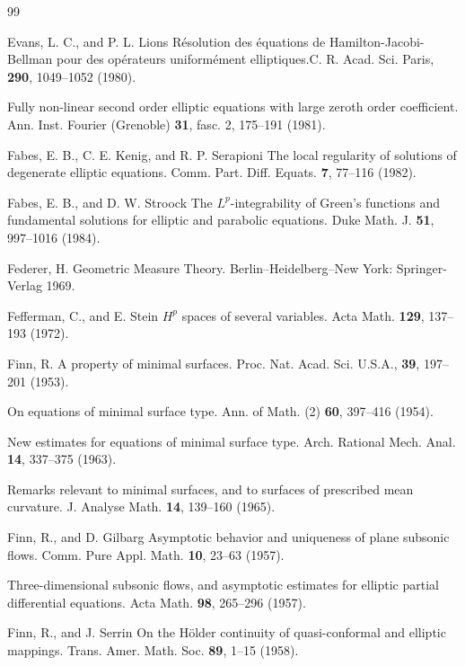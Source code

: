 \begin{thebibliography}{99}

Evans, L. C., and P. L. Lions
Résolution des équations de Hamilton-Jacobi-Bellman pour des opérateurs uniformément
elliptiques.C. R. Acad. Sci. Paris, \textbf{290}, 1049--1052 (1980).

Fully non-linear second order elliptic equations with large zeroth order coefficient. Ann.
Inst. Fourier (Grenoble) \textbf{31}, fasc. 2, 175--191 (1981).

Fabes, E. B., C. E. Kenig, and R. P. Serapioni
The local regularity of solutions of degenerate elliptic equations. Comm. Part. Diff. Equats.
\textbf{7}, 77--116 (1982).

Fabes, E. B., and D. W. Stroock
The $L^p$-integrability of Green's functions and fundamental solutions for elliptic and
parabolic equations. Duke Math. J. \textbf{51}, 997--1016 (1984).

Federer, H.
Geometric Measure Theory. Berlin--Heidelberg--New York: Springer-Verlag 1969.

Fefferman, C., and E. Stein
$H^p$ spaces of several variables. Acta Math. \textbf{129}, 137--193 (1972).

Finn, R.
A property of minimal surfaces. Proc. Nat. Acad. Sci. U.S.A., \textbf{39}, 197--201 (1953).

On equations of minimal surface type. Ann. of Math. (2) \textbf{60}, 397--416 (1954).

New estimates for equations of minimal surface type. Arch. Rational Mech. Anal. \textbf{14},
337--375 (1963).

Remarks relevant to minimal surfaces, and to surfaces of prescribed mean curvature.
J. Analyse Math. \textbf{14}, 139--160 (1965).

Finn, R., and D. Gilbarg
Asymptotic behavior and uniqueness of plane subsonic flows. Comm. Pure Appl. Math.
\textbf{10}, 23--63 (1957).

Three-dimensional subsonic flows, and asymptotic estimates for elliptic partial differential
equations. Acta Math. \textbf{98}, 265--296 (1957).

Finn, R., and J. Serrin
On the Hölder continuity of quasi-conformal and elliptic mappings. Trans. Amer. Math.
Soc. \textbf{89}, 1--15 (1958).


\end{thebibliography}
